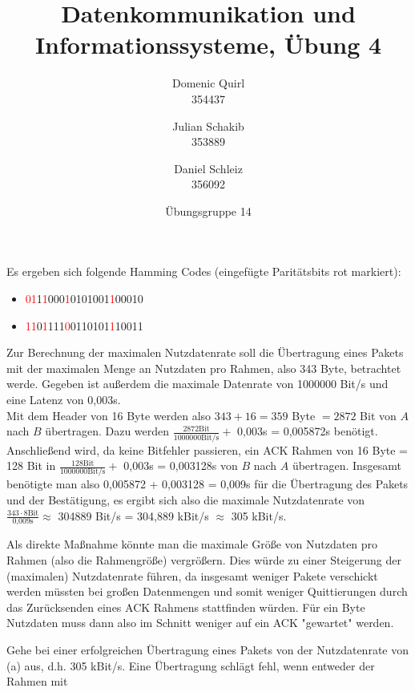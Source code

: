 \documentclass{../exercisesheet}
\title{Datenkommunikation und Informationssysteme, Übung 4}
\author{
    Domenic Quirl \\ 354437
    \and
    Julian Schakib \\ 353889
    \and 
    Daniel Schleiz \\ 356092
}
\date{Übungsgruppe 14}
\begin{document}
\maketitle
\pointtable


\begin{exercise}{1}
	Es ergeben sich folgende Hamming Codes (eingefügte Paritätsbits rot markiert):
	\begin{itemize}
	\item \textcolor{red}{01}1\textcolor{red}{1}000\textcolor{red}{1}0101001\textcolor{red}{1}00010
	\item \textcolor{red}{11}0\textcolor{red}{1}111\textcolor{red}{0}0110101\textcolor{red}{1}10011
	\end{itemize}
\end{exercise}

\begin{exercise}{4}
\begin{subexercise}
	Zur Berechnung der maximalen Nutzdatenrate soll die Übertragung eines Pakets mit der maximalen Menge an Nutzdaten pro Rahmen, also 343 Byte, betrachtet werde. Gegeben ist
	außerdem die maximale Datenrate von 1000000 Bit/s und eine Latenz von 0,003s. \\
	Mit dem Header von 16 Byte werden also $343+16=359$ Byte $= 2872$ Bit von $A$ nach $B$ übertragen. Dazu werden $\frac{2872 \text{Bit}}{1000000 \text{Bit/s}} +$ 0,003s 
	= 0,005872s benötigt. Anschließend wird, da keine Bitfehler passieren, ein ACK Rahmen von 16 Byte = 128 Bit in $\frac{128 \text{Bit}}{1000000 \text{Bit/s}} +$ 0,003s = 0,003128s von
	$B$ nach $A$ übertragen. Insgesamt benötigte man also 0,005872 + 0,003128 = 0,009s für die Übertragung des Pakets und der Bestätigung, es ergibt sich also die maximale
	Nutzdatenrate von $\frac{343\cdot 8\text{Bit}}{\text{0,009s}}\approx$ 304889 Bit/s = 304,889 kBit/s $\approx$ 305 kBit/s.
\end{subexercise}
\begin{subexercise}
	Als direkte Maßnahme könnte man die maximale Größe von Nutzdaten pro Rahmen (also die Rahmengröße) vergrößern. Dies würde zu einer Steigerung der (maximalen) Nutzdatenrate führen, da 
	insgesamt weniger Pakete verschickt werden müssten bei großen Datenmengen und somit weniger Quittierungen durch das Zurücksenden eines ACK Rahmens stattfinden
	würden. Für ein Byte Nutzdaten muss dann also im Schnitt weniger auf ein ACK "gewartet" werden.
\end{subexercise}
\begin{subexercise}
	Gehe bei einer erfolgreichen Übertragung eines Pakets von der Nutzdatenrate von (a) aus, d.h. 305 kBit/s. Eine Übertragung schlägt fehl, wenn entweder der Rahmen mit

\end{subexercise}
\end{exercise}
\end{document}
